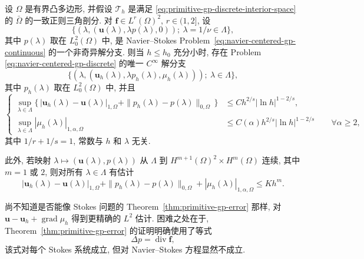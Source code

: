 \setcounter{statement}{2}
\begin{Theorem}\label{thm:navier-centered-gp-branch}
设 $\Omega$ 是有界凸多边形, 并假设 $\mathcal T_h$ 是满足
\eqref{eq:primitive-gp-discrete-interior-space} 的 $\bar\Omega$ 的一致正则三角剖分.
对 $\boldsymbol f\in L^r(\Omega)^2$, $r\in(1,2]$, 设
\[
\{(\lambda,(\boldsymbol u(\lambda),\lambda p(\lambda),0));
\ \lambda=1/\nu\in\Lambda\},
\]
其中 $p(\lambda)$ 取在 $L_0^2(\Omega)$ 中, 是 Navier--Stokes
Problem~\eqref{eq:navier-centered-gp-continuous} 的一个非奇异解分支.
则当 $h\leq h_0$ 充分小时, 存在 Problem~
\eqref{eq:navier-centered-gp-discrete} 的唯一 $C^\infty$ 解分支
\[
\{(\lambda,(\boldsymbol u_h(\lambda),\lambda p_h(\lambda),
\mu_h(\lambda)));\ \lambda\in\Lambda\},
\]
其中 $p_h(\lambda)$ 取在 $L_0^2(\Omega)$ 中, 并且
\begin{equation}\label{eq:navier-centered-gp-branch-errors}
\left\{
\begin{aligned}
\sup_{\lambda\in\Lambda}
\{\,|\boldsymbol u_h(\lambda)-\boldsymbol u(\lambda)|_{1,\Omega}
+\|p_h(\lambda)-p(\lambda)\|_{0,\Omega}\,\}
&\leq Ch^{2/s}|\ln h|^{1-2/s},\\
\sup_{\lambda\in\Lambda}|\mu_h(\lambda)|_{1,\alpha,\Omega}
&\leq C(\alpha)h^{2/s}|\ln h|^{1-2/s}
\qquad\forall\alpha\geq2,
\end{aligned}
\right.
\end{equation}
其中 $1/r+1/s=1$, 常数与 $h$ 和 $\lambda$ 无关.

此外, 若映射 $\lambda\mapsto(\boldsymbol u(\lambda),p(\lambda))$
从 $\Lambda$ 到 $H^{m+1}(\Omega)^2\times H^m(\Omega)$ 连续,
其中 $m=1$ 或 $2$, 则对所有 $\lambda\in\Lambda$ 有估计
\begin{equation}\label{eq:navier-centered-gp-smooth-error}
|\boldsymbol u_h(\lambda)-\boldsymbol u(\lambda)|_{1,\Omega}
+\|p_h(\lambda)-p(\lambda)\|_{0,\Omega}
+|\mu_h(\lambda)|_{1,\alpha,\Omega}
\leq Kh^m.
\end{equation}
\end{Theorem}

\setcounter{statement}{4}
\begin{Remark}\label{rem:navier-centered-gp-corrected-l2-open}
尚不知道是否能像 Stokes 问题的
Theorem~\ref{thm:primitive-gp-error} 那样, 对
$\boldsymbol u-\boldsymbol u_h+\operatorname{grad}\mu_h$ 得到更精确的
$L^2$ 估计. 困难之处在于, Theorem~\ref{thm:primitive-gp-error} 的证明明确使用了等式
\[
\Delta p=\operatorname{div}\boldsymbol f,
\]
该式对每个 Stokes 系统成立, 但对 Navier--Stokes 方程显然不成立.
\end{Remark}

